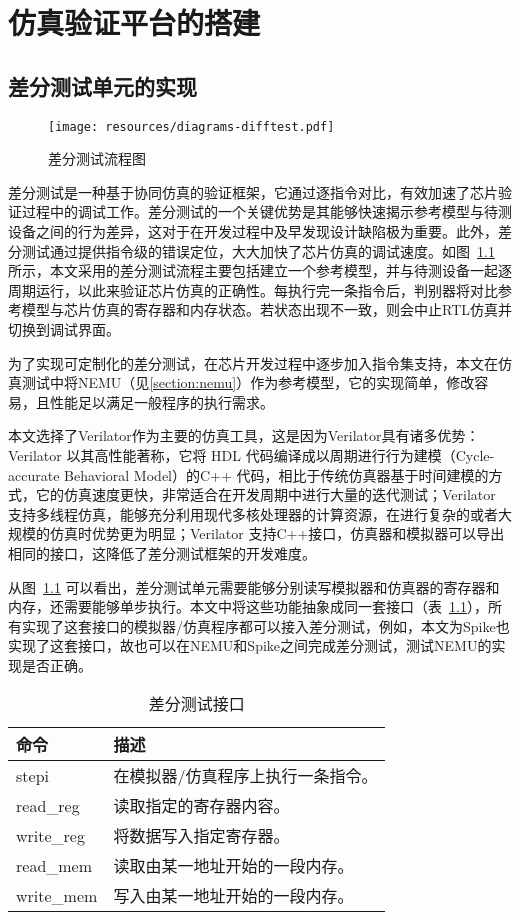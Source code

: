 
\chapter{仿真验证平台的搭建}

\section{差分测试单元的实现} \label{section:difftest}

\begin{figure}
    \centering
    \texttt{[image: resources/diagrams-difftest.pdf]}
    \caption{差分测试流程图}
    \label{fig:difftest}
\end{figure}

差分测试是一种基于协同仿真的验证框架，它通过逐指令对比，有效加速了芯片验证过程中的调试工作\cite{xuDevelopingHighPerformance2022}。差分测试的一个关键优势是其能够快速揭示参考模型与待测设备之间的行为差异，这对于在开发过程中及早发现设计缺陷极为重要。此外，差分测试通过提供指令级的错误定位，大大加快了芯片仿真的调试速度。如图~\ref{fig:difftest} 所示，本文采用的差分测试流程主要包括建立一个参考模型，并与待测设备一起逐周期运行，以此来验证芯片仿真的正确性。每执行完一条指令后，判别器将对比参考模型与芯片仿真的寄存器和内存状态。若状态出现不一致，则会中止RTL仿真并切换到调试界面。

为了实现可定制化的差分测试，在芯片开发过程中逐步加入指令集支持，本文在仿真测试中将NEMU（见\ref{section:nemu}）作为参考模型，它的实现简单，修改容易，且性能足以满足一般程序的执行需求。

本文选择了Verilator作为主要的仿真工具，这是因为Verilator具有诸多优势：Verilator 以其高性能著称，它将 HDL 代码编译成以周期进行行为建模（Cycle-accurate Behavioral Model）的C++ 代码，相比于传统仿真器基于时间建模的方式，它的仿真速度更快，非常适合在开发周期中进行大量的迭代测试；Verilator 支持多线程仿真，能够充分利用现代多核处理器的计算资源，在进行复杂的或者大规模的仿真时优势更为明显；Verilator 支持C++接口，仿真器和模拟器可以导出相同的接口，这降低了差分测试框架的开发难度。

从图~\ref{fig:difftest} 可以看出，差分测试单元需要能够分别读写模拟器和仿真器的寄存器和内存，还需要能够单步执行。本文中将这些功能抽象成同一套接口（表~\ref{tab:difftest-api}），所有实现了这套接口的模拟器/仿真程序都可以接入差分测试，例如，本文为Spike\cite{RiscvsoftwaresrcRiscvisasim2023}也实现了这套接口，故也可以在NEMU和Spike之间完成差分测试，测试NEMU的实现是否正确。

\begin{table}
\centering
\begin{tabular}{|l|p{10cm}|}
\hline
\textbf{命令} & \textbf{描述} \\
\hline
stepi & 在模拟器/仿真程序上执行一条指令。\\
\hline
read\_reg & 读取指定的寄存器内容。\\
\hline
write\_reg & 将数据写入指定寄存器。 \\
\hline
read\_mem & 读取由某一地址开始的一段内存。 \\
\hline
write\_mem & 写入由某一地址开始的一段内存。 \\
\hline
\end{tabular}
\caption{差分测试接口}
\label{tab:difftest-api}
\end{table}

